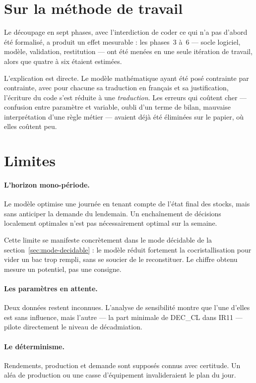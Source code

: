 \section{Sur la méthode de travail}

Le découpage en sept phases, avec l'interdiction de coder ce qui n'a pas d'abord été
formalisé, a produit un effet mesurable : les phases~3 à~6 --- socle logiciel, modèle,
validation, restitution --- ont été menées en une seule itération de travail, alors que
quatre à six étaient estimées.

L'explication est directe. Le modèle mathématique ayant été posé contrainte par contrainte,
avec pour chacune sa traduction en français et sa justification, l'écriture du code s'est
réduite à une \emph{traduction}. Les erreurs qui coûtent cher --- confusion entre paramètre
et variable, oubli d'un terme de bilan, mauvaise interprétation d'une règle métier --- avaient
déjà été éliminées sur le papier, où elles coûtent peu.

\section{Limites}

\paragraph{L'horizon mono-période.} Le modèle optimise une journée en tenant compte de
l'état final des stocks, mais sans anticiper la demande du lendemain. Un enchaînement de
décisions localement optimales n'est pas nécessairement optimal sur la semaine.

Cette limite se manifeste concrètement dans le mode décidable de la
section~\ref{sec:mode-decidable} : le modèle réduit fortement la cocristallisation pour
vider un bac trop rempli, sans se soucier de le reconstituer. Le chiffre obtenu mesure un
potentiel, pas une consigne.

\paragraph{Les paramètres en attente.} Deux données restent inconnues. L'analyse de
sensibilité montre que l'une d'elles est sans influence, mais l'autre --- la part minimale
de DEC\_CL dans IR11 --- pilote directement le niveau de décadmiation.

\paragraph{Le déterminisme.} Rendements, production et demande sont supposés connus avec
certitude. Un aléa de production ou une casse d'équipement invalideraient le plan du jour.

